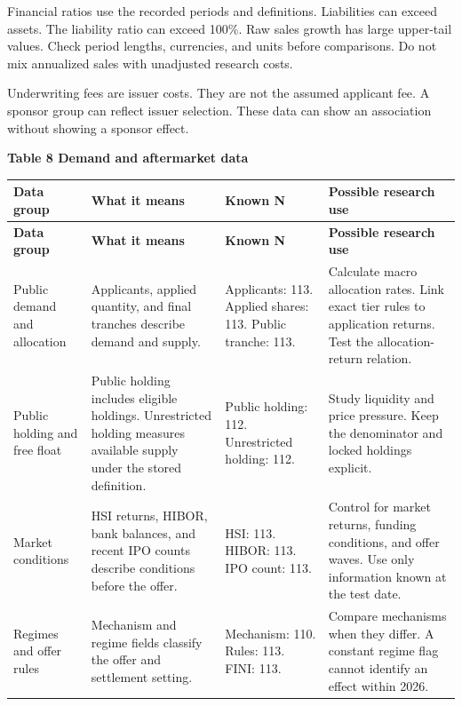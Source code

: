 \documentclass[10pt,a4paper]{article}
\begin{document}
Financial ratios use the recorded periods and definitions. Liabilities can exceed assets. The liability ratio can exceed 100\%. Raw sales growth has large upper-tail values. Check period lengths, currencies, and units before comparisons. Do not mix annualized sales with unadjusted research costs.


Underwriting fees are issuer costs. They are not the assumed applicant fee. A sponsor group can reflect issuer selection. These data can show an association without showing a sponsor effect.


\par\addvspace{5pt}
\noindent\textbf{Table 8  Demand and aftermarket data}
\par\nobreak\vspace{2pt}
{\small
\setlength{\tabcolsep}{4pt}
\renewcommand{\arraystretch}{1.08}
\setlength{\LTpre}{0pt}\setlength{\LTpost}{3pt}
\begin{longtable}{@{}>{\raggedright\arraybackslash}p{2.5660cm}>{\raggedright\arraybackslash}p{4.2767cm}>{\raggedright\arraybackslash}p{3.0412cm}>{\raggedright\arraybackslash}p{6.2725cm}@{}}
\toprule
\textbf{Data group} & \textbf{What it means} & \textbf{Known N} & \textbf{Possible research use} \\
\midrule\endfirsthead
\toprule
\textbf{Data group} & \textbf{What it means} & \textbf{Known N} & \textbf{Possible research use} \\
\midrule\endhead
\bottomrule\endfoot
Public demand and allocation & Applicants, applied quantity, and final tranches describe demand and supply. & Applicants: 113. Applied shares: 113. Public tranche: 113. & Calculate macro allocation rates. Link exact tier rules to application returns. Test the allocation-return relation. \\
Public holding and free float & Public holding includes eligible holdings. Unrestricted holding measures available supply under the stored definition. & Public holding: 112. Unrestricted holding: 112. & Study liquidity and price pressure. Keep the denominator and locked holdings explicit. \\
Market conditions & HSI returns, HIBOR, bank balances, and recent IPO counts describe conditions before the offer. & HSI: 113. HIBOR: 113. IPO count: 113. & Control for market returns, funding conditions, and offer waves. Use only information known at the test date. \\
Regimes and offer rules & Mechanism and regime fields classify the offer and settlement setting. & Mechanism: 110. Rules: 113. FINI: 113. & Compare mechanisms when they differ. A constant regime flag cannot identify an effect within 2026. \\

\end{longtable}}
\end{document}
